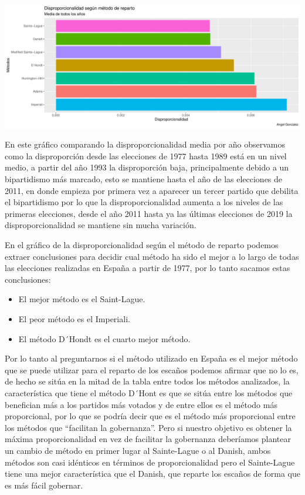 \documentclass[12pt,a4paper,]{book}
\providecommand{\tightlist}{%
  \setlength{\itemsep}{0pt}\setlength{\parskip}{0pt}}
\numberwithin{dummy}{section}
\theoremstyle{ocrenumbox}
\theoremstyle{blacknumex}
\theoremstyle{blacknumbox}
\theoremstyle{ocrenum}
\theoremstyle{ocrenum}
\begin{document}
\begin{center}\includegraphics[width=0.95\linewidth]{figurasR/unnamed-chunk-139-2} \end{center}

En este gráfico comparando la disproporcionalidad media por año
observamos como la disproporción desde las elecciones de 1977 hasta 1989
está en un nivel medio, a partir del año 1993 la disproporción baja,
principalmente debido a un bipartidismo más marcado, esto se mantiene
hasta el año de las elecciones de 2011, en donde empieza por primera vez
a aparecer un tercer partido que debilita el bipartidismo por lo que la
disproporcionalidad aumenta a los niveles de las primeras elecciones,
desde el año 2011 hasta ya las últimas elecciones de 2019 la
disproporcionalidad se mantiene sin mucha variación.

En el gráfico de la disproporcionalidad según el método de reparto
podemos extraer conclusiones para decidir cual método ha sido el mejor a
lo largo de todas las elecciones realizadas en España a partir de 1977,
por lo tanto sacamos estas conclusiones:

\begin{itemize}
\tightlist
\item
  El mejor método es el Saint-Lague.
\item
  El peor método es el Imperiali.
\item
  El método D´Hondt es el cuarto mejor método.
\end{itemize}

Por lo tanto al preguntarnos si el método utilizado en España es el
mejor método que se puede utilizar para el reparto de los escaños
podemos afirmar que no lo es, de hecho se sitúa en la mitad de la tabla
entre todos los métodos analizados, la característica que tiene el
método D´Hont es que se sitúa entre los métodos que benefician más a los
partidos más votados y de entre ellos es el método más proporcional, por
lo que se podría decir que es el método más proporcional entre los
métodos que ``facilitan la gobernanza''. Pero si nuestro objetivo es
obtener la máxima proporcionalidad en vez de facilitar la gobernanza
deberíamos plantear un cambio de método en primer lugar al Sainte-Lague
o al Danish, ambos métodos son casi idénticos en términos de
proporcionalidad pero el Sainte-Lague tiene una mejor característica que
el Danish, que reparte los escaños de forma que es más fácil gobernar.




\end{document}
